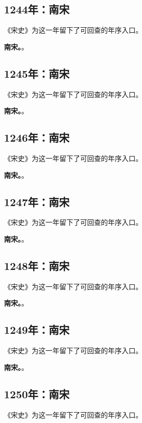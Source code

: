 \subsection{1244年：南宋}
《宋史》为这一年留下了可回查的年序入口。

\noindent\textbf{南宋。}。

\subsection{1245年：南宋}
《宋史》为这一年留下了可回查的年序入口。

\noindent\textbf{南宋。}。

\subsection{1246年：南宋}
《宋史》为这一年留下了可回查的年序入口。

\noindent\textbf{南宋。}。

\subsection{1247年：南宋}
《宋史》为这一年留下了可回查的年序入口。

\noindent\textbf{南宋。}。

\subsection{1248年：南宋}
《宋史》为这一年留下了可回查的年序入口。

\noindent\textbf{南宋。}。

\subsection{1249年：南宋}
《宋史》为这一年留下了可回查的年序入口。

\noindent\textbf{南宋。}。

\subsection{1250年：南宋}
《宋史》为这一年留下了可回查的年序入口。

